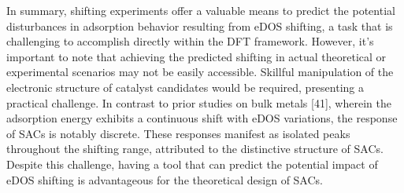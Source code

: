 In summary, shifting experiments offer a valuable means to predict the potential disturbances in adsorption behavior resulting from eDOS shifting, a task that is challenging to accomplish directly within the DFT framework. However, it's important to note that achieving the predicted shifting in actual theoretical or experimental scenarios may not be easily accessible. Skillful manipulation of the electronic structure of catalyst candidates would be required, presenting a practical challenge. In contrast to prior studies on bulk metals [41], wherein the adsorption energy exhibits a continuous shift with eDOS variations, the response of SACs is notably discrete. These responses manifest as isolated peaks throughout the shifting range, attributed to the distinctive structure of SACs. Despite this challenge, having a tool that can predict the potential impact of eDOS shifting is advantageous for the theoretical design of SACs.
